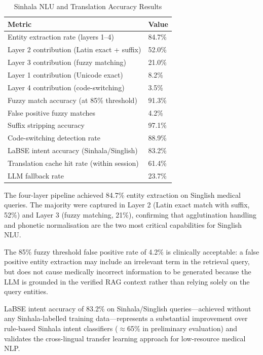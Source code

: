 \documentclass[12pt,a4paper]{report}
\begin{document}
\begin{table}[H]
\centering
\caption{Sinhala NLU and Translation Accuracy Results}
\label{tab:si_nlu}
\renewcommand{\arraystretch}{1.3}
\begin{tabularx}{\textwidth}{@{}Xl@{}}
\toprule
\textbf{Metric} & \textbf{Value} \\
\midrule
Entity extraction rate (layers 1--4)          & 84.7\% \\
Layer 2 contribution (Latin exact + suffix)   & 52.0\% \\
Layer 3 contribution (fuzzy matching)         & 21.0\% \\
Layer 1 contribution (Unicode exact)          & 8.2\% \\
Layer 4 contribution (code-switching)         & 3.5\% \\
Fuzzy match accuracy (at 85\% threshold)      & 91.3\% \\
False positive fuzzy matches                  & 4.2\%  \\
Suffix stripping accuracy                     & 97.1\% \\
Code-switching detection rate                 & 88.9\% \\
LaBSE intent accuracy (Sinhala/Singlish)      & 83.2\% \\
Translation cache hit rate (within session)   & 61.4\% \\
LLM fallback rate                             & 23.7\% \\
\bottomrule
\end{tabularx}
\end{table}

The four-layer pipeline achieved 84.7\% entity extraction on Singlish medical queries. The majority were captured in Layer 2 (Latin exact match with suffix, 52\%) and Layer 3 (fuzzy matching, 21\%), confirming that agglutination handling and phonetic normalisation are the two most critical capabilities for Singlish NLU.

The 85\% fuzzy threshold false positive rate of 4.2\% is clinically acceptable: a false positive entity extraction may include an irrelevant term in the retrieval query, but does not cause medically incorrect information to be generated because the LLM is grounded in the verified RAG context rather than relying solely on the query entities.

LaBSE intent accuracy of 83.2\% on Sinhala/Singlish queries---achieved without any Sinhala-labelled training data---represents a substantial improvement over rule-based Sinhala intent classifiers ($\approx$65\% in preliminary evaluation) and validates the cross-lingual transfer learning approach for low-resource medical NLP.
\end{document}
